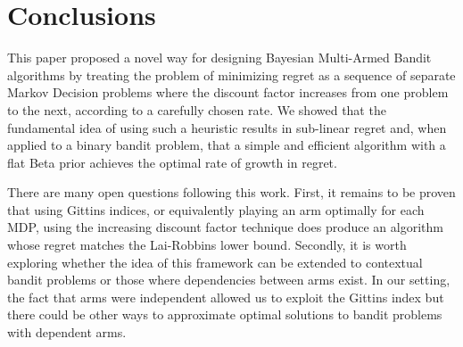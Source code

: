 \section{Conclusions} \label{sec:conclusions}
This paper proposed a novel way for designing Bayesian Multi-Armed Bandit algorithms by treating the problem of minimizing regret as a sequence of separate Markov Decision problems where the discount factor increases from one problem to the next, according to a carefully chosen rate. We  showed that the fundamental idea of using such a heuristic results in sub-linear regret and, when applied to a binary bandit problem, that a simple and efficient algorithm with a flat Beta prior achieves the optimal rate of growth in regret.

There are many open questions following this work. First, it remains to be proven that using Gittins indices, or equivalently playing an arm optimally for each MDP, using the increasing discount factor technique does produce an algorithm whose regret matches the Lai-Robbins lower bound. Secondly, it is worth exploring whether the idea of this framework can be extended to contextual bandit problems or those where dependencies between arms exist. In our setting, the fact that arms were independent allowed us to exploit the Gittins index but there could be other ways to approximate optimal solutions to bandit problems with dependent arms.